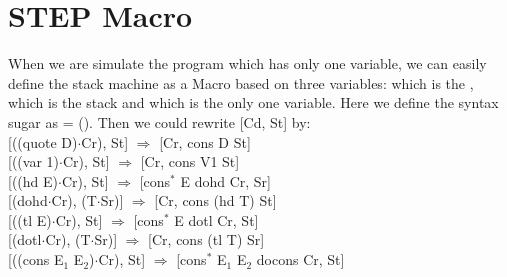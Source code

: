 \section{STEP Macro}\label{appendix:step}
When we are simulate the \WHILE program which has only one variable, we can easily define the stack machine as a Macro based on three variables:  which is the ,  which is the stack and  which is the only one variable.
Here we define the syntax sugar  as   =   (). 
Then we could rewrite [Cd, St] by:\\
\indent\hspace{0.5cm}[((quote D)$\cdot$Cr), St]\hspace{1.55cm} $\Rightarrow$ \hspace{0.5cm} [Cr, cons D St]\\
\indent\hspace{0.5cm}[((var 1)$\cdot$Cr), St]\hspace{2.1cm} $\Rightarrow$ \hspace{0.5cm} [Cr, cons V1 St]\\
\indent\hspace{0.5cm}[((hd E)$\cdot$Cr), St]\hspace{2.15cm} $\Rightarrow$ \hspace{0.5cm} [cons$^{*}$ E dohd Cr, Sr]\\
\indent\hspace{0.5cm}[(dohd$\cdot$Cr), (T$\cdot$Sr)]\hspace{1.7cm} $\Rightarrow$ \hspace{0.5cm} [Cr, cons (hd T) St]\\
\indent\hspace{0.5cm}[((tl E)$\cdot$Cr), St]\hspace{2.35cm} $\Rightarrow$ \hspace{0.5cm} [cons$^{*}$ E dotl Cr, St]\\
\indent\hspace{0.5cm}[(dotl$\cdot$Cr), (T$\cdot$Sr)]\hspace{1.9cm} $\Rightarrow$ \hspace{0.5cm} [Cr, cons (tl T) Sr]\\
\indent\hspace{0.5cm}[((cons E$_1$ E$_2$)$\cdot$Cr), St]\hspace{1.1cm} $\Rightarrow$ \hspace{0.5cm} [cons$^{*}$ E$_1$ E$_2$ docons Cr, St]\\
